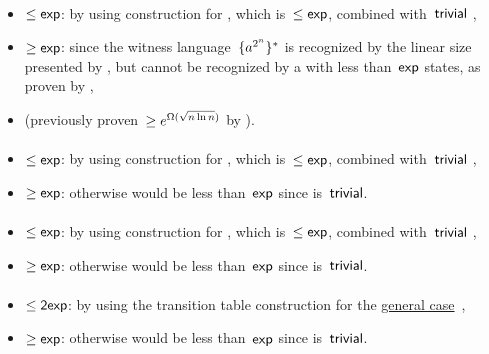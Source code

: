 \paragraph{\ODLA{}\tto\TNFA}\label{cost:1DLAto2NFAu}
\begin{itemize}
	\item $\le\mathsf{exp}$: by using construction for \hyperref[cost:1DLAto1DFAu]{\ODLA{}\tto\ODFA}, which is~$\le\mathsf{exp}$, combined with~$\mathsf{trivial}$ \ODFA{}\tto\TNFA,
	\item $\ge\mathsf{exp}$: since the witness language~$\{a^{2^n}\}^*$ is recognized by the linear size \ODLA presented by , but cannot be recognized by a \TNFA with less than~$\mathsf{exp}$ states, as proven by ,
	\item (previously proven~$\ge e^{\Omega(\sqrt{n\ln n})}$ by ).
\end{itemize}
\paragraph{\ODLA{}\tto\ONFA}\label{cost:1LAto1NFAu}
\begin{itemize}
	\item $\le\mathsf{exp}$: by using construction for \hyperref[cost:1DLAto1DFAu]{\ODLA{}\tto\ODFA}, which is~$\le\mathsf{exp}$, combined with~$\mathsf{trivial}$ \ODFA{}\tto\ONFA,
	\item $\ge\mathsf{exp}$: otherwise \hyperref[cost:1DLAto2NFAu]{\ODLA{}\tto\TNFA} would be less than~$\mathsf{exp}$ since \ONFA{}\tto\TNFA is~$\mathsf{trivial}$.
\end{itemize}
\paragraph{\ODLA{}\tto\TDFA}\label{cost:1DLAto2DFAu}
\begin{itemize}
	\item $\le\mathsf{exp}$: by using construction for \hyperref[cost:1DLAto1DFAu]{\ODLA{}\tto\ODFA}, which is~$\le\mathsf{exp}$, combined with~$\mathsf{trivial}$ \ODFA{}\tto\TDFA,
	\item $\ge\mathsf{exp}$: otherwise \hyperref[cost:1DLAto2NFAu]{\ODLA{}\tto\TNFA} would be less than~$\mathsf{exp}$ since \TDFA{}\tto\TNFA is~$\mathsf{trivial}$.
\end{itemize}
\paragraph{\OLA{}\tto\ODFA}
\begin{itemize}
	\item $\le\mathsf{2exp}$: by using the transition table construction for the \hyperref[cost:1LAto1DFA]{general case}~\cite{PigPis14},
	\item $\ge\mathsf{exp}$: otherwise \hyperref[cost:1DLAto1DFAu]{\ODLA{}\tto\ODFA} would be less than~$\mathsf{exp}$ since \ODLA{}\tto\OLA is~$\mathsf{trivial}$.
\end{itemize}
